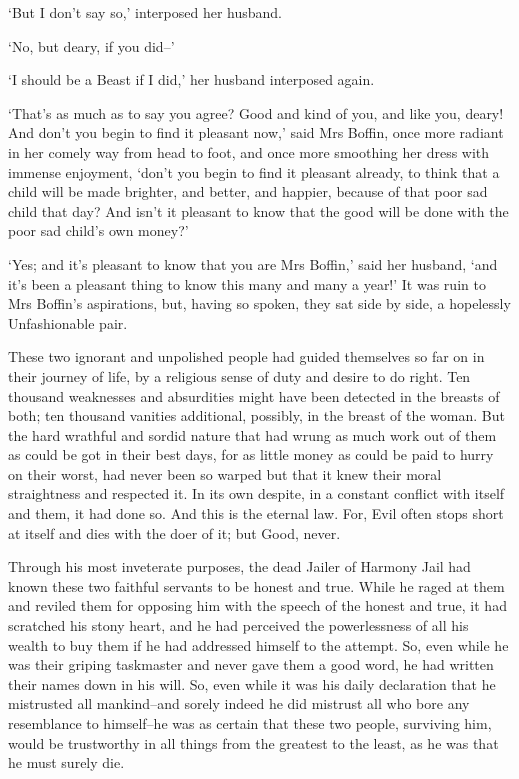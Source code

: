 ‘But I don’t say so,’ interposed her husband.

‘No, but deary, if you did--’

‘I should be a Beast if I did,’ her husband interposed again.

‘That’s as much as to say you agree? Good and kind of you, and like you,
deary! And don’t you begin to find it pleasant now,’ said Mrs Boffin,
once more radiant in her comely way from head to foot, and once more
smoothing her dress with immense enjoyment, ‘don’t you begin to find
it pleasant already, to think that a child will be made brighter, and
better, and happier, because of that poor sad child that day? And isn’t
it pleasant to know that the good will be done with the poor sad child’s
own money?’

‘Yes; and it’s pleasant to know that you are Mrs Boffin,’ said her
husband, ‘and it’s been a pleasant thing to know this many and many a
year!’ It was ruin to Mrs Boffin’s aspirations, but, having so spoken,
they sat side by side, a hopelessly Unfashionable pair.

These two ignorant and unpolished people had guided themselves so far on
in their journey of life, by a religious sense of duty and desire to do
right. Ten thousand weaknesses and absurdities might have been detected
in the breasts of both; ten thousand vanities additional, possibly, in
the breast of the woman. But the hard wrathful and sordid nature that
had wrung as much work out of them as could be got in their best days,
for as little money as could be paid to hurry on their worst, had never
been so warped but that it knew their moral straightness and respected
it. In its own despite, in a constant conflict with itself and them, it
had done so. And this is the eternal law. For, Evil often stops short at
itself and dies with the doer of it; but Good, never.

Through his most inveterate purposes, the dead Jailer of Harmony Jail
had known these two faithful servants to be honest and true. While he
raged at them and reviled them for opposing him with the speech of the
honest and true, it had scratched his stony heart, and he had perceived
the powerlessness of all his wealth to buy them if he had addressed
himself to the attempt. So, even while he was their griping taskmaster
and never gave them a good word, he had written their names down in his
will. So, even while it was his daily declaration that he mistrusted all
mankind--and sorely indeed he did mistrust all who bore any resemblance
to himself--he was as certain that these two people, surviving him,
would be trustworthy in all things from the greatest to the least, as he
was that he must surely die.

